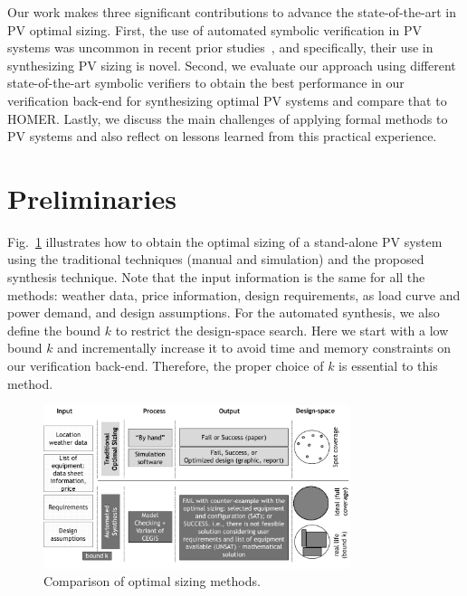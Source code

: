 \documentclass[runningheads]{llncs}
\begin{document}
Our work makes three significant contributions to advance the state-of-the-art in PV optimal sizing. First, the use of automated symbolic verification in PV systems was uncommon in recent prior studies~\cite{TrindadeCordeiro19}, and specifically, their use in synthesizing PV sizing is novel. Second, we evaluate our approach using different state-of-the-art symbolic verifiers to obtain the best performance in our verification back-end for synthesizing optimal PV systems and compare that to HOMER. Lastly, we discuss the main challenges of applying formal methods to PV systems and also reflect on lessons learned from this practical experience.

\section{Preliminaries}
\label{sec:AutomatedVerification}

Fig.~\ref{fig:optimization} illustrates how to obtain the optimal sizing of a stand-alone PV system using the traditional techniques (manual and simulation) and the proposed synthesis technique. Note that the input information is the same for all the methods: weather data, price information, design requirements, as load curve and power demand, and design assumptions. For the automated synthesis, we also define the bound $k$ to restrict the design-space search. Here we start with a low bound $k$ and incrementally increase it to avoid time and memory constraints on our verification back-end. Therefore, the proper choice of $k$ is essential to this method.

\begin{figure}[h]
\includegraphics[width=0.8\textwidth]{optimalsizingprocess3}
\centering
\caption{Comparison of optimal sizing methods.}
\label{fig:optimization}
\end{figure}
\end{document}
